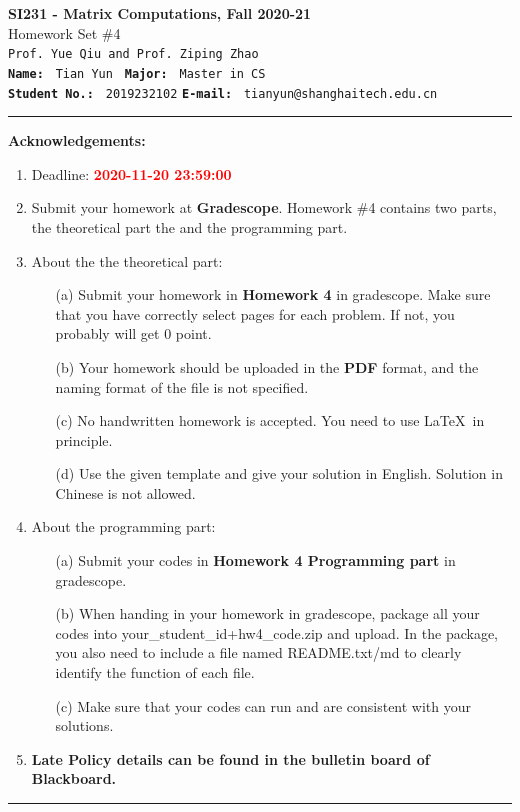 \documentclass[english,onecolumn]{IEEEtran}
\begin{document}
\begin{center}
	\textbf{\LARGE{SI231 - Matrix Computations, Fall 2020-21}}\\
	{\Large Homework Set \#4}\\
	\texttt{Prof. Yue Qiu and Prof. Ziping Zhao}\\
	\texttt{\textbf{Name:}}   	\texttt{ Tian Yun }  		\hspace{1bp}
	\texttt{\textbf{Major:}}  	\texttt{ Master in CS } 	\\
	\texttt{\textbf{Student No.:}} 	\texttt{ 2019232102}     \hspace{1bp}
	\texttt{\textbf{E-mail:}} 	\texttt{ tianyun@shanghaitech.edu.cn}
\par\end{center}

\noindent
\rule{\linewidth}{0.4pt}
{\bf {\large Acknowledgements:}}
\begin{enumerate}
    \item Deadline: \textcolor{red}{\textbf{2020-11-20 23:59:00}}
    \item Submit your homework at \textbf{Gradescope}.
    Homework \#4 contains two parts, the theoretical part the and the programming part.
    \item About the the theoretical part:
    \begin{enumerate}
            \item[(a)] Submit your homework in \textbf{Homework 4} in gradescope. Make sure that you have correctly select pages for each problem. If not, you probably will get 0 point.
            \item[(b)] Your homework should be uploaded in the \textbf{PDF} format, and the naming format of the file is not specified.
            \item[(c)] No handwritten homework is accepted. You need to use \LaTeX $\,$ in principle.
            \item[(d)] Use the given template and give your solution in English. Solution in Chinese is not allowed. 
        \end{enumerate}
  \item About the programming part:
  \begin{enumerate}
      \item[(a)] Submit your codes in \textbf{Homework 4 Programming part} in gradescope. 
      \item[(b)] When handing in your homework in gradescope, package all your codes into {\sf your\_student\_id+hw4\_code.zip} and upload. In the package, you also need to include a file named {\sf README.txt/md} to clearly identify the function of each file.
     \item[(c)] Make sure that your codes can run and are consistent with your solutions.
  \end{enumerate}
  \item \textbf{Late Policy details can be found in the bulletin board of Blackboard.}
\end{enumerate}
\rule{\linewidth}{0.4pt}
\end{document}
